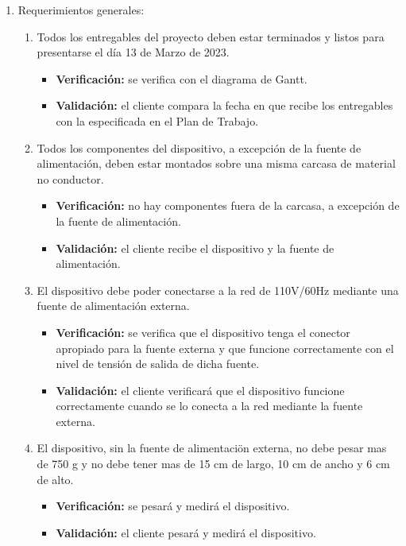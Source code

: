 \documentclass[
11pt, %
codirector, %
]{charter}
\begin{document}
\begin{enumerate}

\item Requerimientos generales:
\begin{enumerate}
\item Todos los entregables del proyecto deben estar terminados y listos para presentarse el día 13 de Marzo de 2023.
\begin{itemize}
	\item \textbf{Verificación:} se verifica con el diagrama de Gantt.
	\item \textbf{Validación:} el cliente compara la fecha en que recibe los entregables con la especificada en el Plan de Trabajo.
\end{itemize}

\item Todos los componentes del dispositivo, a excepción de la fuente de alimentación, deben estar montados sobre una misma carcasa de material no conductor.
\begin{itemize}
	\item \textbf{Verificación:} no hay componentes fuera de la carcasa, a excepción de la fuente de alimentación.
	\item \textbf{Validación:} el cliente recibe el dispositivo y la fuente de alimentación.
\end{itemize}

\item El dispositivo debe poder conectarse a la red de 110V/60Hz mediante una fuente de alimentación externa.
\begin{itemize}
	\item \textbf{Verificación:} se verifica que el dispositivo tenga el conector apropiado para la fuente externa y que funcione correctamente con el nivel de tensión de salida de dicha fuente.
	\item \textbf{Validación:} el cliente verificará que el dispositivo funcione correctamente cuando se lo conecta a la red mediante la fuente externa.
\end{itemize}

\item El dispositivo, sin la fuente de alimentaciön externa, no debe pesar mas de 750 g y no debe tener mas de 15 cm de largo, 10 cm de ancho y 6 cm de alto.
\begin{itemize}
	\item \textbf{Verificación:} se pesará y medirá el dispositivo.
	\item \textbf{Validación:} el cliente pesará y medirá el dispositivo.
\end{itemize}


\end{enumerate}
\end{enumerate}
\end{document}
